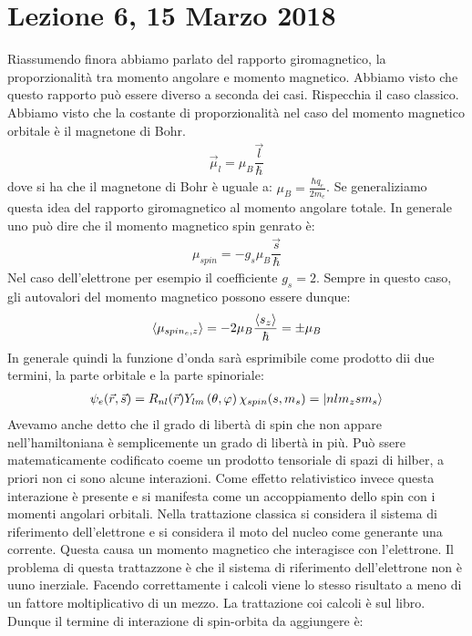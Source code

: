 \documentclass[../AppuntiStruttura]{subfiles}
\begin{document}
	\section*{Lezione 6, 15 Marzo 2018}
	
	Riassumendo finora abbiamo parlato del rapporto giromagnetico, la proporzionalità tra momento angolare e momento magnetico. Abbiamo visto che questo rapporto può essere diverso a seconda dei casi. Rispecchia il caso classico. Abbiamo visto che la costante di proporzionalità nel caso del momento magnetico orbitale è il magnetone di Bohr. 
	\begin{gather*}
		\vec{\mu}_l=\mu_{B}\dfrac{\vec{l}}{\hbar}
	\end{gather*}
	dove si ha che il magnetone di Bohr è uguale a: $ \mu_{B}=\frac{\hbar q_{e}}{2m_{e}} $. Se generaliziamo questa idea del rapporto giromagnetico al momento angolare totale. In generale uno può dire che il momento magnetico spin genrato è:
	\begin{gather*}
	\mu_{spin}=-g_{s}\mu_{B}\dfrac{\vec{s}}{\hbar}
	\end{gather*}
	Nel caso dell'elettrone per esempio il coefficiente $ g_s=2 $. Sempre in questo caso, gli autovalori del momento magnetico possono essere dunque:
	\begin{gather*}                              \expval{\mu_{spin_{e},z}}=-2\mu_{B}\dfrac{\expval{s_z}}{\hbar}=\pm \mu_{B} 
	\end{gather*} 
	In generale quindi la funzione d'onda sarà esprimibile come prodotto dii due termini, la parte orbitale e la parte spinoriale:
	\begin{gather*}
	\psi_{e}(\vec{r},\vec{s})=R_{nl}(\vec{r})Y_{lm}\left(\theta,\varphi\right)\chi_{spin}(s,m_{s})=\ket{nlm_{z}sm_{s}}
	\end{gather*}
	Avevamo anche detto che il grado di libertà di spin che non appare nell'hamiltoniana è semplicemente un grado di libertà in più. Può ssere matematicamente codificato coeme un prodotto tensoriale di spazi di hilber, a priori non ci sono alcune interazioni. Come effetto relativistico invece questa interazione è presente e si manifesta come un accoppiamento dello spin con i momenti angolari orbitali. Nella trattazione classica si considera il sistema di riferimento dell'elettrone e si considera il moto del nucleo come generante una corrente. Questa causa un momento magnetico che interagisce con l'elettrone. Il problema di questa trattazzone è che il sistema di riferimento dell'elettrone non è uuno inerziale. Facendo correttamente i calcoli viene lo stesso risultato a meno di un fattore moltiplicativo di un mezzo. La trattazione coi calcoli è sul libro. Dunque il termine di interazione di spin-orbita da aggiungere è:
\end{document}
